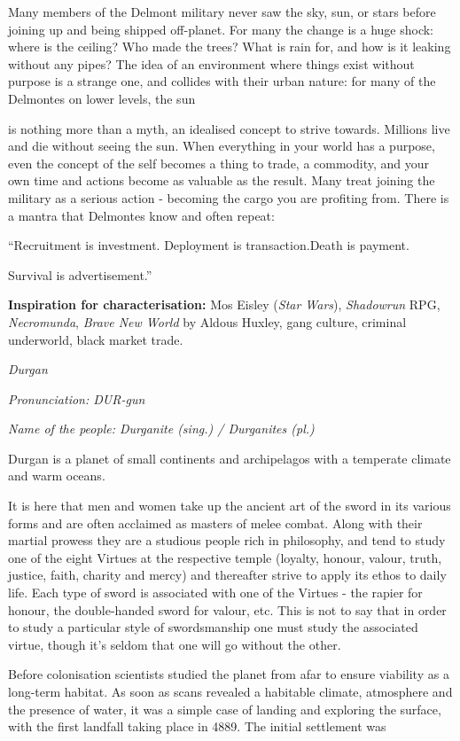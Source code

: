 \documentclass{scrbook}
\begin{document}
Many members of the Delmont military never saw the sky, sun, or stars before joining up and being shipped off-planet. For many the change is a huge shock: where is the ceiling? Who made the trees? What is rain for, and how is it leaking without any pipes? The idea of an environment where things exist without purpose is a strange one, and collides with their urban nature: for many of the Delmontes on lower levels, the sun

is nothing more than a myth, an idealised concept to strive towards. Millions live and die without seeing the sun. When everything in your world has a purpose, even the concept of the self becomes a thing to trade, a commodity, and your own time and actions become as valuable as the result. Many treat joining the military as a serious action - becoming the cargo you are profiting from. There is a mantra that Delmontes know and often repeat:

``Recruitment is investment. Deployment is transaction.Death is payment.

Survival is advertisement.''

\textbf{Inspiration for characterisation:} Mos Eisley (\textit{Star Wars}), \textit{Shadowrun} RPG, \textit{Necromunda}, \textit{Brave New World} by Aldous Huxley, gang culture, criminal underworld, black market trade.

\textit{Durgan}

\textit{Pronunciation: DUR-gun}

\textit{Name of the people: Durganite (sing.) / Durganites (pl.)}

Durgan is a planet of small continents and archipelagos with a temperate climate and warm oceans.

It is here that men and women take up the ancient art of the sword in its various forms and are often acclaimed as masters of melee combat. Along with their martial prowess they are a studious people rich in philosophy, and tend to study one of the eight Virtues at the respective temple (loyalty, honour, valour, truth, justice, faith, charity and mercy) and thereafter strive to apply its ethos to daily life. Each type of sword is associated with one of the Virtues - the rapier for honour, the double-handed sword for valour, etc. This is not to say that in order to study a particular style of swordsmanship one must study the associated virtue, though it's seldom that one will go without the other.

Before colonisation scientists studied the planet from afar to ensure viability as a long-term habitat. As soon as scans revealed a habitable climate, atmosphere and the presence of water, it was a simple case of landing and exploring the surface, with the first landfall taking place in 4889. The initial settlement was
\end{document}
